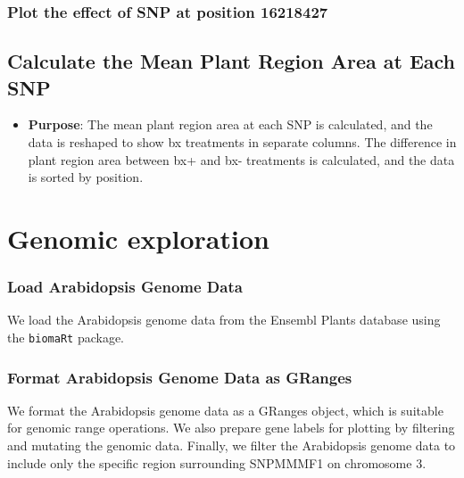 \documentclass[
  11pt,
]{article}
\providecommand{\tightlist}{%
  \setlength{\itemsep}{0pt}\setlength{\parskip}{0pt}}\usepackage{longtable,booktabs,array}
\begin{document}
\subsubsection{Plot the effect of SNP at position
16218427}\label{plot-the-effect-of-snp-at-position-16218427}

\subsection{Calculate the Mean Plant Region Area at Each
SNP}\label{calculate-the-mean-plant-region-area-at-each-snp}

\begin{itemize}
\tightlist
\item
  \textbf{Purpose}: The mean plant region area at each SNP is
  calculated, and the data is reshaped to show bx treatments in separate
  columns. The difference in plant region area between bx+ and bx-
  treatments is calculated, and the data is sorted by position.
\end{itemize}

\section{Genomic exploration}\label{genomic-exploration}

\subsubsection{Load Arabidopsis Genome
Data}\label{load-arabidopsis-genome-data}

We load the Arabidopsis genome data from the Ensembl Plants database
using the \texttt{biomaRt} package.

\subsubsection{Format Arabidopsis Genome Data as
GRanges}\label{format-arabidopsis-genome-data-as-granges}

We format the Arabidopsis genome data as a GRanges object, which is
suitable for genomic range operations. We also prepare gene labels for
plotting by filtering and mutating the genomic data. Finally, we filter
the Arabidopsis genome data to include only the specific region
surrounding SNPMMMF1 on chromosome 3.
\end{document}
